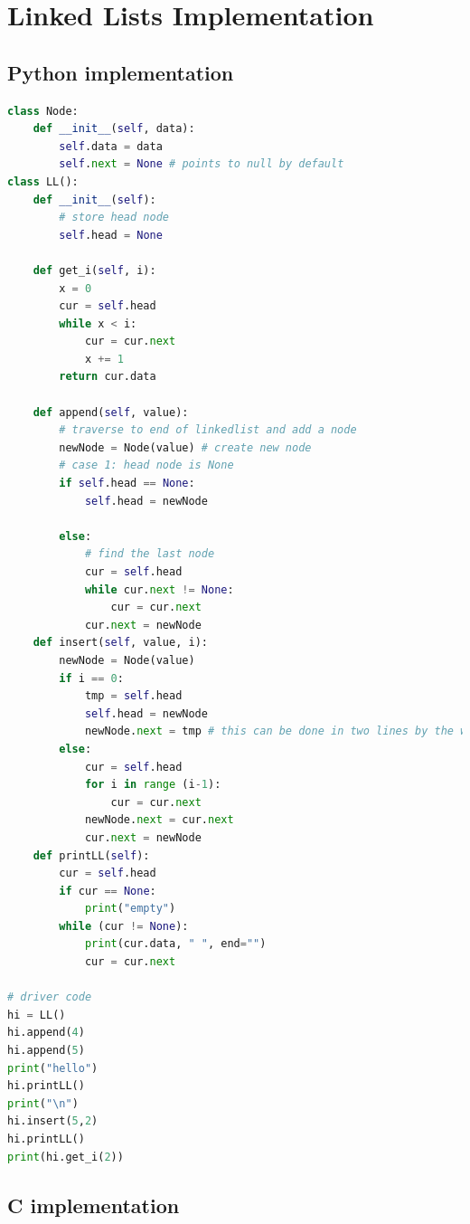 \documentclass{tufte-handout}
\begin{document}
\appendix
\section{Linked Lists Implementation}
\subsection{Python implementation}
\begin{lstlisting}[language=Python]
class Node:
    def __init__(self, data):
        self.data = data
        self.next = None # points to null by default
class LL():
    def __init__(self):
        # store head node
        self.head = None

    def get_i(self, i):
        x = 0
        cur = self.head
        while x < i:
            cur = cur.next
            x += 1
        return cur.data

    def append(self, value):
        # traverse to end of linkedlist and add a node
        newNode = Node(value) # create new node
        # case 1: head node is None
        if self.head == None:
            self.head = newNode

        else:
            # find the last node
            cur = self.head
            while cur.next != None:
                cur = cur.next
            cur.next = newNode
    def insert(self, value, i):
        newNode = Node(value)
        if i == 0:
            tmp = self.head
            self.head = newNode
            newNode.next = tmp # this can be done in two lines by the way
        else:
            cur = self.head
            for i in range (i-1):
                cur = cur.next
            newNode.next = cur.next
            cur.next = newNode
    def printLL(self):
        cur = self.head
        if cur == None:
            print("empty")
        while (cur != None):
            print(cur.data, " ", end="")
            cur = cur.next

# driver code
hi = LL()
hi.append(4)
hi.append(5)
print("hello")
hi.printLL()
print("\n")
hi.insert(5,2)
hi.printLL()
print(hi.get_i(2))
\end{lstlisting}
\subsection{C implementation}
\end{document}
